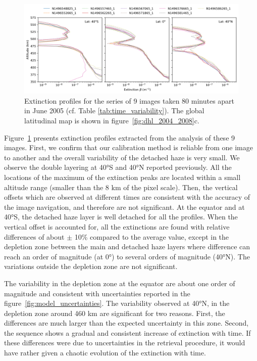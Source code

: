 \begin{figure}[!ht]
    \centering
    \includegraphics[width=\textwidth]{Fig/Time_variability.png}
    \caption{Extinction profiles for the series
    of 9 images taken 80 minutes apart in June 2005 (cf. Table \ref{tab:time_variability}).
    The global latitudinal map is shown in figure~\ref{fig:dhl_2004_2008}c.}
    \label{fig:time_variability}
\end{figure}

Figure~\ref{fig:time_variability} presents extinction profiles extracted from the analysis of these 9 images.
First, we confirm that our calibration method is reliable from one image to another and the overall
variability of the detached haze is very small. We observe the double layering at \ang{40}S and \ang{40}N reported
previously. All the locations of the maximum of the extinction peaks are located within a small altitude range (smaller
than the 8 km of the pixel scale). Then, the vertical offsets which are observed at different times are consistent
with  the accuracy of the image navigation, and therefore are not significant. At the equator and at \ang{40}S, the detached
haze layer is well detached for all the profiles. When the vertical offset is accounted for, all the extinctions are found
with relative differences of about $\pm$ 10\% compared to the average value, except in the depletion zone between
the main and detached haze layers where difference can reach an order of magnitude (at \ang{0}) to several orders of magnitude
(\ang{40}N). The variations outside the depletion zone are not significant.

The variability in the depletion zone at the equator are about one order of magnitude and
consistent with uncertainties reported in the figure~\ref{fig:model_uncertainties}.
The variability observed at \ang{40}N, in the depletion zone around 460 km are significant for two reasons.
First, the differences are much larger than the expected uncertainty in this zone. Second, the sequence shows
a gradual and consistent increase of extinction with time. If these differences were due to uncertainties in
the retrieval procedure, it would have rather given a chaotic evolution of the extinction with time.


